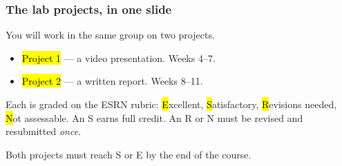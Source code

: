 \documentclass[slidestop,compress,mathserif]{beamer}
\begin{document}
\begin{frame}
\frametitle{The lab projects, in one slide}

You will work in the same group on two projects.

\vspace{0.5em}
\begin{itemize}
  \item \hl{Project 1} --- a video presentation. Weeks 4--7.
  \item \hl{Project 2} --- a written report. Weeks 8--11.
\end{itemize}

\vspace{0.5em}
Each is graded on the ESRN rubric: \hl{E}xcellent, \hl{S}atisfactory,
\hl{R}evisions needed, \hl{N}ot assessable. An S earns full credit. An R
or N must be revised and resubmitted \emph{once}.

\vspace{0.5em}
Both projects must reach S or E by the end of the course.


\end{frame}
\end{document}
